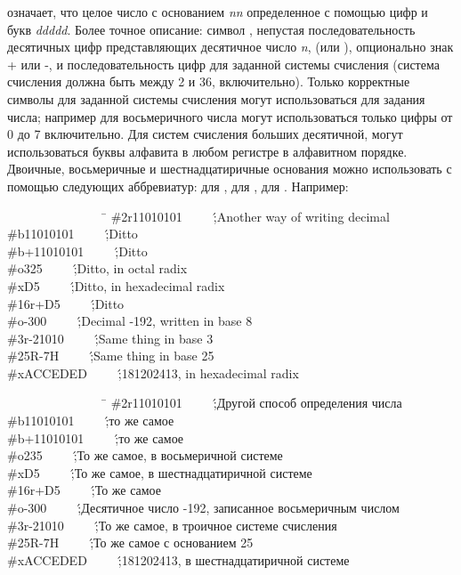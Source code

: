 означает, что целое число с основанием \emph{nn} определенное с
помощью цифр и букв \emph{ddddd}. Более точное описание:
символ \cd{\#}, непустая последовательность десятичных цифр
представляющих десятичное число \emph{n},  (или ), опционально знак + или -, и последовательность цифр для заданной системы счисления (система счисления должна быть между 2 и 36, включительно). Только корректные символы для заданной системы счисления могут использоваться для задания числа; например для восьмеричного числа могут использоваться только цифры от 0 до 7 включительно. Для систем счисления больших десятичной, могут использоваться буквы алфавита в любом регистре в алфавитном порядке. Двоичные, восьмеричные и шестнадцатиричные основания можно использовать с помощью следующих аббревиатур:  для ,  для ,  для . Например:
\begin{lisp}
~~~~~~~~~~~~~~~~\=\kill
\>\#2r11010101~~~~~\';\textrm{Another way of writing  decimal} \\
\>\#b11010101~~~~~\';\textrm{Ditto} \\
\>\#b+11010101~~~~~\';\textrm{Ditto} \\
\>\#o325~~~~~\';\textrm{Ditto, in octal radix} \\
\>\#xD5~~~~~\';\textrm{Ditto, in hexadecimal radix} \\
\>\#16r+D5~~~~~\';\textrm{Ditto} \\
\>\#o-300~~~~~\';\textrm{Decimal -192, written in base 8} \\
\>\#3r-21010~~~~~\';\textrm{Same thing in base 3} \\
\>\#25R-7H~~~~~\';\textrm{Same thing in base 25} \\
\>\#xACCEDED~~~~~\';\textrm{181202413, in hexadecimal radix}
\end{lisp}

\begin{lisp}
~~~~~~~~~~~~~~~~\=\kill
\>\#2r11010101~~~~~\';\textrm{Другой способ определения
числа } \\
\>\#b11010101~~~~~\';\textrm{то же самое} \\
\>\#b+11010101~~~~~\';\textrm{то же самое} \\
\>\#o235~~~~~\';\textrm{То же самое, в восьмеричной системе} \\
\>\#xD5~~~~~\';\textrm{То же самое, в шестнадцатиричной системе} \\
\>\#16r+D5~~~~~\';\textrm{То же самое} \\
\>\#o-300~~~~~\';\textrm{Десятичное число -192, записанное восьмеричным числом} \\
\>\#3r-21010~~~~~\';\textrm{То же самое, в троичное системе счисления} \\
\>\#25R-7H~~~~~\';\textrm{То же самое с основанием 25} \\
\>\#xACCEDED~~~~~\';\textrm{181202413, в шестнадцатиричной системе}
\end{lisp}

